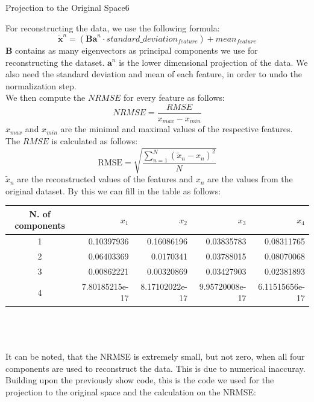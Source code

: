 \begin{questions}
\begin{question}{Projection to the Original Space}{6}
\begin{answer}
For reconstructing the data, we use the following formula:
\begin{equation*}
\tilde{\mathbf{x}}^{n}=(\mathbf{B a}^{n} \cdot standard\_deviation_{feature})+ mean_{feature}
\end{equation*}
$\mathbf{B}$ contains as many eigenvectors as principal components we use for reconstructing the dataset. $\mathbf{a}^{n}$ is the lower dimensional projection of the data. We also need the standard deviation and mean of each feature, in order to undo the normalization step.\\
We then compute the $NRMSE$ for every feature as follows:
\begin{equation*}
NRMSE = \frac{RMSE}{x_{max}-x_{min}}
\end{equation*}
$x_{max}$ and $x_{min}$ are the minimal and maximal values of the respective features. The $RMSE$ is calculated as follows:
\begin{equation*}
\mathrm{RMSE}=\sqrt{\frac{\sum_{n=1}^{N}(\tilde{x}_{n}-x_{n})^{2}}{N}}
\end{equation*}
$\tilde{x}_{n}$ are the reconstructed values of the features and $x_{n}$ are the values from the original dataset.
By this we can fill in the table as follows:\\

\begin{tabular}{c|r|r|r|r}
N. of components & $x_1$ & $x_2$ & $x_3$ & $x_4$ \\
\hline
1 & 0.10397936 &0.16086196& 0.03835783 &0.08311765 \\
2 & 0.06403369 &0.0170341  &0.03788015 &0.08070068\\
3 & 0.00862221& 0.00320869 &0.03427903 &0.02381893\\
4 & 7.80185215e-17& 8.17102022e-17 &9.95720008e-17 &6.11515656e-17 
\end{tabular}\\ \\ \\
It can be noted, that the NRMSE is extremely small, but not zero, when all four components are used to reconstruct the data. This is due to numerical inaccuray. Building upon the previously show code, this is the code we used for the projection to the original space and the calculation on the NRMSE:\\

\end{answer}
\end{question}


\end{questions}
